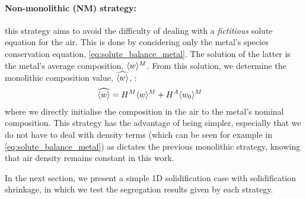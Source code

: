 \paragraph{Non-monolithic (NM) strategy:}
this strategy aims to avoid the difficulty of dealing with a \emph{fictitious} solute equation for the air.
This is done by considering only the metal's species conservation equation, \cref{eq:solute_balance_metal}.
The solution of the latter is the metal's average composition, $\langle w \rangle^M$. From this solution, we determine the monolithic
composition value, $\widehat{\langle w \rangle}$, :  
\begin{align}
\label{eq:nonmonolithic_solute}
& \widehat{\langle w \rangle} = H^M \langle w \rangle^M + H^A \langle w_0 \rangle^M     
\end{align}
where we directly initialise the composition in the air to the metal's nominal composition.
This strategy has the advantage of being simpler, especially that we do not have to deal with density terms
(which can be seen for example in \cref{eq:solute_balance_metal}) 
as dictates the previous monolithic strategy, knowing that air density remains constant in this work.

In the next section, we present a simple 1D solidification case with solidification shrinkage, in which we test
the segregation results given by each strategy.



